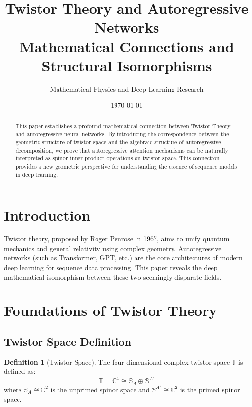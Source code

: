 \documentclass[12pt,a4paper]{article}
\title{\textbf{Twistor Theory and Autoregressive Networks}\\\large Mathematical Connections and Structural Isomorphisms}
\author{Mathematical Physics and Deep Learning Research}
\date{\today}
\theoremstyle{definition}
\newtheorem{definition}{Definition}[section]
\begin{document}
\maketitle

\begin{abstract}
This paper establishes a profound mathematical connection between Twistor Theory and autoregressive neural networks. By introducing the correspondence between the geometric structure of twistor space and the algebraic structure of autoregressive decomposition, we prove that autoregressive attention mechanisms can be naturally interpreted as spinor inner product operations on twistor space. This connection provides a new geometric perspective for understanding the essence of sequence models in deep learning.
\end{abstract}

\tableofcontents
\newpage

\section{Introduction}

Twistor theory, proposed by Roger Penrose in 1967, aims to unify quantum mechanics and general relativity using complex geometry. Autoregressive networks (such as Transformer, GPT, etc.) are the core architectures of modern deep learning for sequence data processing. This paper reveals the deep mathematical isomorphism between these two seemingly disparate fields.

\section{Foundations of Twistor Theory}

\subsection{Twistor Space Definition}

\begin{definition}[Twistor Space]
The four-dimensional complex twistor space $\mathbb{T}$ is defined as:
\begin{equation}
\mathbb{T} = \mathbb{C}^4 \cong \mathbb{S}_A \oplus \mathbb{S}^{A'}
\end{equation}
where $\mathbb{S}_A \cong \mathbb{C}^2$ is the unprimed spinor space and $\mathbb{S}^{A'} \cong \mathbb{C}^2$ is the primed spinor space.
\end{definition}
\end{document}
